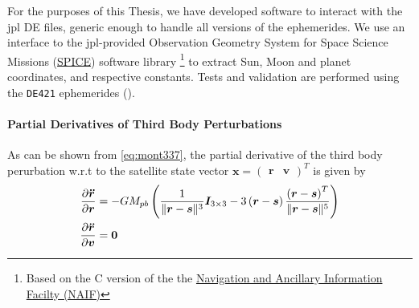 For the purposes of this Thesis, we have developed software to interact with the 
\gls{jpl} DE files, generic enough to handle all versions of the ephemerides. 
We use an interface to the \gls{jpl}-provided Observation Geometry System
for Space Science Missions (\href{https://naif.jpl.nasa.gov/naif/}{SPICE}) 
software library \footnote{Based on the C version of the the 
\href{https://naif.jpl.nasa.gov/naif/toolkit_C.html}{Navigation and Ancillary Information Facilty (NAIF)}} 
to extract Sun, Moon and planet coordinates, and respective constants. Tests and 
validation are performed using the \texttt{DE421} ephemerides (\cite{Folkner2009}).

\paragraph{Partial Derivatives of Third Body Perturbations}\label{par:third-body-perturbations-partials}

As can be shown from \ref{eq:mont337}, the partial derivative of the third body 
perurbation w.r.t to the satellite state vector $\bm{x}=\begin{pmatrix}\bm{r} & \bm{v} \end{pmatrix}^T$ is given by
\begin{equation}
  \begin{aligned}
    \frac{\partial \bm{\ddot{r}}}{\partial \bm{r}} &= 
      -GM_{pb} \left( \frac{1}{\lVert\bm{r}-\bm{s}\rVert^3} \bm{I}_{3\times 3} 
      -3 \left(\bm{r}-\bm{s} \right) \frac{\left(\bm{r}-\bm{s} \right)^T}{\lVert\bm{r}-\bm{s}\rVert^5}
      \right) \\
    \frac{\partial \bm{\ddot{r}}}{\partial \bm{v}} &= \bm{0}
  \end{aligned}
\end{equation}

